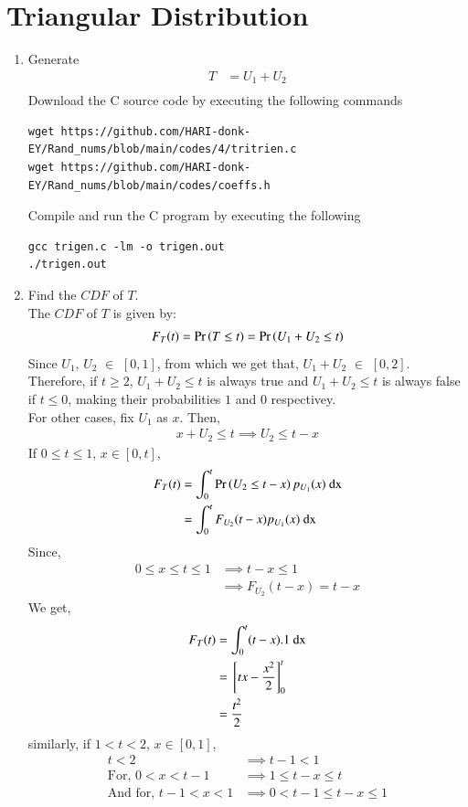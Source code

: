 \documentclass[journal,12pt,twocolumn]{IEEEtran}
\renewcommand\thesection{\arabic{section}}
\begin{document}
\section{Triangular Distribution}
\begin{enumerate}[label=\thesection.\arabic*
,ref=\thesection.\theenumi]

\item 
Generate
\begin{align*}
T & = U_1 + U_2\\
\end{align*}
\solution Download the C source code by executing the following commands
\begin{lstlisting}
wget https://github.com/HARI-donk-EY/Rand_nums/blob/main/codes/4/tritrien.c
wget https://github.com/HARI-donk-EY/Rand_nums/blob/main/codes/coeffs.h
\end{lstlisting}
Compile and run the C program by executing the following
\begin{lstlisting}
gcc trigen.c -lm -o trigen.out
./trigen.out
\end{lstlisting}

\item
Find the $CDF$ of $T$.\\
\solution The $CDF$ of $T$ is given by:
\begin{align}
F_T(t) = \Pr\left(T \leq t\right) = \Pr\left(U_1 + U_2 \leq t\right)
\end{align}
Since $U_1$, $U_2$ $\in$ $[0,1]$, from which we get that, $U_1 + U_2$ $\in$ $[0,2]$.\\
Therefore, if $t \geq 2$, $U_1+U_2 \leq t$ is always true and $U_1+U_2 \leq t$ is always false if $t \leq 0$, making their probabilities $1$ and $0$ respectivey.\\
For other cases, fix $U_1$ as $x$. Then,
\begin{align*}
x + U_2 \leq t \implies U_2 \leq t-x
\end{align*}
If $0 \leq t \leq 1$, $x \in [0,t]$,
\begin{align*}
F_T(t) & = \int_0^t \Pr\left(U_2 \leq t-x\right) p_{U_1}(x) \text{ dx}\\
	& = \int_0^t F_{U_2}(t-x) p_{U_1}(x) \text{ dx}\\
\end{align*}
Since,
\begin{align*}
0 \leq x \leq t \leq 1 & \implies t-x \leq 1\\
& \implies F_{U_2}(t-x) = t-x
\end{align*}
We get,
\begin{align*}
F_T(t) & = \int_0^t (t-x).1\text{ dx}\\
& = {}\left[tx - \frac{x^2}{2}\right]_0^t\\
& = \frac{t^2}{2}
\end{align*}
similarly, if $1 < t < 2$, $ x \in [0, 1]$,
\begin{align*}
t < 2 & \implies t-1 <1\\
\text{For,\ \ \ } 0 < x < t-1 & \implies 1 \leq t-x \leq t\\
\text{And for,\ \ \ } t-1<x<1 & \implies 0<t-1 \leq t-x \leq 1
\end{align*}


\end{enumerate}
\end{document}
